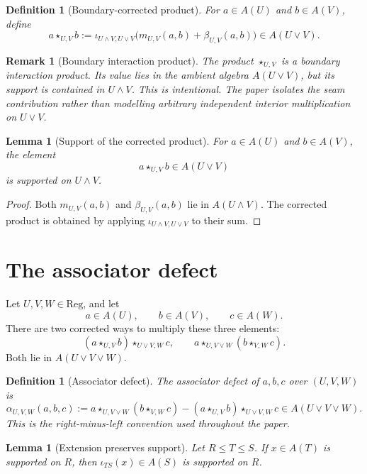 \documentclass[11pt]{article}
\newtheorem{lemma}[theorem]{Lemma}
\newtheorem{definition}[theorem]{Definition}
\newtheorem{remark}[theorem]{Remark}
\newcommand{\Reg}{\mathrm{Reg}}
\begin{document}
\begin{definition}[Boundary-corrected product]
For \(a\in A(U)\) and \(b\in A(V)\), define
\[
a\star_{U,V} b
:=
\iota_{U\wedge V,U\vee V}\bigl(m_{U,V}(a,b)+\beta_{U,V}(a,b)\bigr)
\in A(U\vee V).
\]
\end{definition}

\begin{remark}[Boundary interaction product]
The product \(\star_{U,V}\) is a boundary interaction product. Its value lies in the ambient algebra \(A(U\vee V)\), but its support is contained in \(U\wedge V\). This is intentional. The paper isolates the seam contribution rather than modelling arbitrary independent interior multiplication on \(U\vee V\).
\end{remark}

\begin{lemma}[Support of the corrected product]
For \(a\in A(U)\) and \(b\in A(V)\), the element
\[
a\star_{U,V}b\in A(U\vee V)
\]
is supported on \(U\wedge V\).
\end{lemma}

\begin{proof}
Both \(m_{U,V}(a,b)\) and \(\beta_{U,V}(a,b)\) lie in \(A(U\wedge V)\). The corrected product is obtained by applying \(\iota_{U\wedge V,U\vee V}\) to their sum.
\end{proof}

\section{The associator defect}

Let \(U,V,W\in \Reg\), and let
\[
a\in A(U),\qquad b\in A(V),\qquad c\in A(W).
\]
There are two corrected ways to multiply these three elements:
\[
(a\star_{U,V}b)\star_{U\vee V,W}c,
\qquad
 a\star_{U,V\vee W}(b\star_{V,W}c).
\]
Both lie in \(A(U\vee V\vee W)\).

\begin{definition}[Associator defect]
The associator defect of \(a,b,c\) over \((U,V,W)\) is
\[
\alpha_{U,V,W}(a,b,c)
:=
 a\star_{U,V\vee W}(b\star_{V,W}c)
-
 (a\star_{U,V}b)\star_{U\vee V,W}c
\in A(U\vee V\vee W).
\]
This is the right-minus-left convention used throughout the paper.
\end{definition}

\begin{lemma}[Extension preserves support]
Let \(R\leq T\leq S\). If \(x\in A(T)\) is supported on \(R\), then \(\iota_{TS}(x)\in A(S)\) is supported on \(R\).
\end{lemma}
\end{document}
